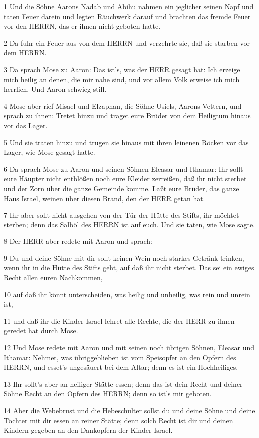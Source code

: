 \par 1 Und die Söhne Aarons Nadab und Abihu nahmen ein jeglicher seinen Napf und taten Feuer darein und legten Räuchwerk darauf und brachten das fremde Feuer vor den HERRN, das er ihnen nicht geboten hatte.
\par 2 Da fuhr ein Feuer aus von dem HERRN und verzehrte sie, daß sie starben vor dem HERRN.
\par 3 Da sprach Mose zu Aaron: Das ist's, was der HERR gesagt hat: Ich erzeige mich heilig an denen, die mir nahe sind, und vor allem Volk erweise ich mich herrlich. Und Aaron schwieg still.
\par 4 Mose aber rief Misael und Elzaphan, die Söhne Usiels, Aarons Vettern, und sprach zu ihnen: Tretet hinzu und traget eure Brüder von dem Heiligtum hinaus vor das Lager.
\par 5 Und sie traten hinzu und trugen sie hinaus mit ihren leinenen Röcken vor das Lager, wie Mose gesagt hatte.
\par 6 Da sprach Mose zu Aaron und seinen Söhnen Eleasar und Ithamar: Ihr sollt eure Häupter nicht entblößen noch eure Kleider zerreißen, daß ihr nicht sterbet und der Zorn über die ganze Gemeinde komme. Laßt eure Brüder, das ganze Haus Israel, weinen über diesen Brand, den der HERR getan hat.
\par 7 Ihr aber sollt nicht ausgehen von der Tür der Hütte des Stifts, ihr möchtet sterben; denn das Salböl des HERRN ist auf euch. Und sie taten, wie Mose sagte.
\par 8 Der HERR aber redete mit Aaron und sprach:
\par 9 Du und deine Söhne mit dir sollt keinen Wein noch starkes Getränk trinken, wenn ihr in die Hütte des Stifts geht, auf daß ihr nicht sterbet. Das sei ein ewiges Recht allen euren Nachkommen,
\par 10 auf daß ihr könnt unterscheiden, was heilig und unheilig, was rein und unrein ist,
\par 11 und daß ihr die Kinder Israel lehret alle Rechte, die der HERR zu ihnen geredet hat durch Mose.
\par 12 Und Mose redete mit Aaron und mit seinen noch übrigen Söhnen, Eleasar und Ithamar: Nehmet, was übriggeblieben ist vom Speisopfer an den Opfern des HERRN, und esset's ungesäuert bei dem Altar; denn es ist ein Hochheiliges.
\par 13 Ihr sollt's aber an heiliger Stätte essen; denn das ist dein Recht und deiner Söhne Recht an den Opfern des HERRN; denn so ist's mir geboten.
\par 14 Aber die Webebrust und die Hebeschulter sollst du und deine Söhne und deine Töchter mit dir essen an reiner Stätte; denn solch Recht ist dir und deinen Kindern gegeben an den Dankopfern der Kinder Israel.
